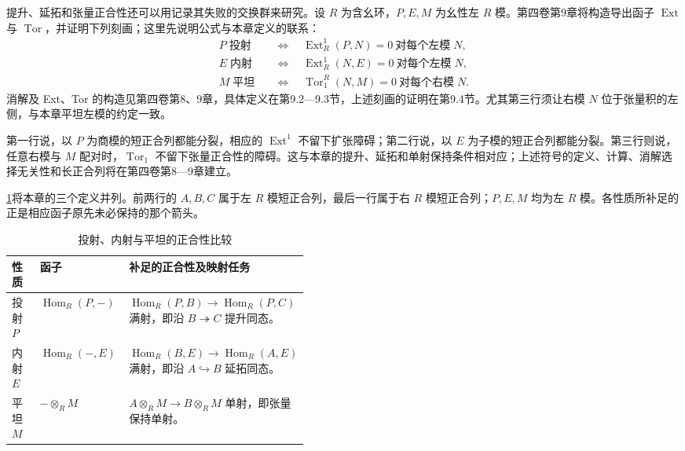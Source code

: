 提升、延拓和张量正合性还可以用记录其失败的交换群来研究。设 \(R\) 为含幺环，\(P,E,M\) 为幺性左 \(R\) 模。第四卷第9章将构造导出函子 \(\operatorname{Ext}\) 与 \(\operatorname{Tor}\)，并证明下列刻画；这里先说明公式与本章定义的联系：
\[
	\begin{aligned}
		P\;\text{投射}&\quad\Longleftrightarrow\quad \operatorname{Ext}_R^1(P,N)=0\ \text{对每个左模}\;N,\\
		E\;\text{内射}&\quad\Longleftrightarrow\quad \operatorname{Ext}_R^1(N,E)=0\ \text{对每个左模}\;N,\\
		M\;\text{平坦}&\quad\Longleftrightarrow\quad \operatorname{Tor}_1^R(N,M)=0\ \text{对每个右模}\;N.
	\end{aligned}
\]
消解及 Ext、Tor 的构造见第四卷第8、9章，具体定义在第9.2—9.3节，上述刻画的证明在第9.4节。尤其第三行须让右模 \(N\) 位于张量积的左侧，与本章平坦左模的约定一致。

\ProseParagraphBreak
第一行说，以 \(P\) 为商模的短正合列都能分裂，相应的 \(\operatorname{Ext}^1\) 不留下扩张障碍；第二行说，以 \(E\) 为子模的短正合列都能分裂。第三行则说，任意右模与 \(M\) 配对时，\(\operatorname{Tor}_1\) 不留下张量正合性的障碍。这与本章的提升、延拓和单射保持条件相对应；上述符号的定义、计算、消解选择无关性和长正合列将在第四卷第8—9章建立。

\ProseParagraphBreak
\cref{b2:tab:projective-injective-flat-exactness}将本章的三个定义并列。前两行的 \(A,B,C\) 属于左 \(R\) 模短正合列，最后一行属于右 \(R\) 模短正合列；\(P,E,M\) 均为左 \(R\) 模。各性质所补足的正是相应函子原先未必保持的那个箭头。
\begin{table}[htbp]
	\centering
	\caption{投射、内射与平坦的正合性比较}\label{b2:tab:projective-injective-flat-exactness}
	\begin{tabularx}{\linewidth}{@{}p{0.13\linewidth}p{0.31\linewidth}X@{}}
		\toprule
		性质 & 函子 & 补足的正合性及映射任务 \\
		\midrule
		投射 \(P\) & \(\operatorname{Hom}_R(P,-)\) & \(\operatorname{Hom}_R(P,B)\to\operatorname{Hom}_R(P,C)\) 满射，即沿 \(B\twoheadrightarrow C\) 提升同态。 \\
		内射 \(E\) & \(\operatorname{Hom}_R(-,E)\) & \(\operatorname{Hom}_R(B,E)\to\operatorname{Hom}_R(A,E)\) 满射，即沿 \(A\hookrightarrow B\) 延拓同态。 \\
		平坦 \(M\) & \(-\otimes_R M\) & \(A\otimes_R M\to B\otimes_R M\) 单射，即张量保持单射。 \\
		\bottomrule
	\end{tabularx}
\end{table}
